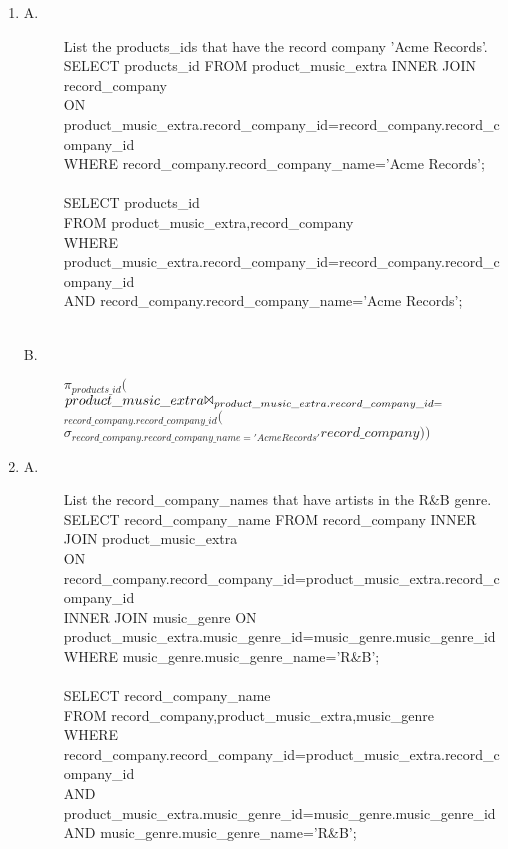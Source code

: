 \documentclass{article}
\begin{document}
\begin{enumerate}
\item
\begin{description}
\item[A.]
\textsf{List the products\_ids that have the record company 'Acme Records'.\\}
SELECT products\_id FROM product\_music\_extra INNER JOIN record\_company\\
ON product\_music\_extra.record\_company\_id=record\_company.record\_company\_id\\
WHERE record\_company.record\_company\_name='Acme Records';\\
\\
SELECT products\_id\\
FROM product\_music\_extra,record\_company\\
WHERE product\_music\_extra.record\_company\_id=record\_company.record\_company\_id\\
AND record\_company.record\_company\_name='Acme Records';\\
\\
\item[B.]
$\pi_{products\_id}($
$product\_music\_extra \Bowtie_{product\_music\_extra.record\_company\_id=}$\\
$_{record\_company.record\_company\_id} ($\\
$\sigma_{record\_company.record\_company\_name='Acme Records'}record\_company))$\\
\end{description}

\item
\begin{description}
\item[A.]
\textsf{List the record\_company\_names that have artists in the R\&B genre.\\}
SELECT record\_company\_name FROM record\_company INNER JOIN product\_music\_extra\\
ON record\_company.record\_company\_id=product\_music\_extra.record\_company\_id\\
INNER JOIN music\_genre ON product\_music\_extra.music\_genre\_id=music\_genre.music\_genre\_id\\
WHERE music\_genre.music\_genre\_name='R\&B';\\
\\
SELECT record\_company\_name\\
FROM record\_company,product\_music\_extra,music\_genre\\
WHERE record\_company.record\_company\_id=product\_music\_extra.record\_company\_id\\
AND product\_music\_extra.music\_genre\_id=music\_genre.music\_genre\_id\\
AND music\_genre.music\_genre\_name='R\&B';\\


\end{description}
\end{enumerate}
\end{document}
